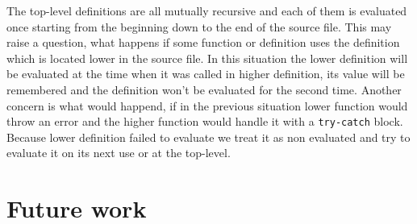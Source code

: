 \documentclass[declaration,shortabstract,english]{iithesis}
\begin{document}
The top-level definitions are all mutually recursive and each of them is evaluated once starting from the beginning
down to the end of the source file. This may raise a question, what happens if some function or definition uses the definition which is located
lower in the source file. In this situation the lower definition will be evaluated at the time when it was called in higher definition,
its value will be remembered and the definition won't be evaluated for the second time.
Another concern is what would happend, if in the previous situation lower function would throw an error and the higher function would
handle it with a \verb+try-catch+ block. Because lower definition failed to evaluate we treat it as non evaluated and try to evaluate it
on its next use or at the top-level.

\chapter{Future work}




\end{document}
